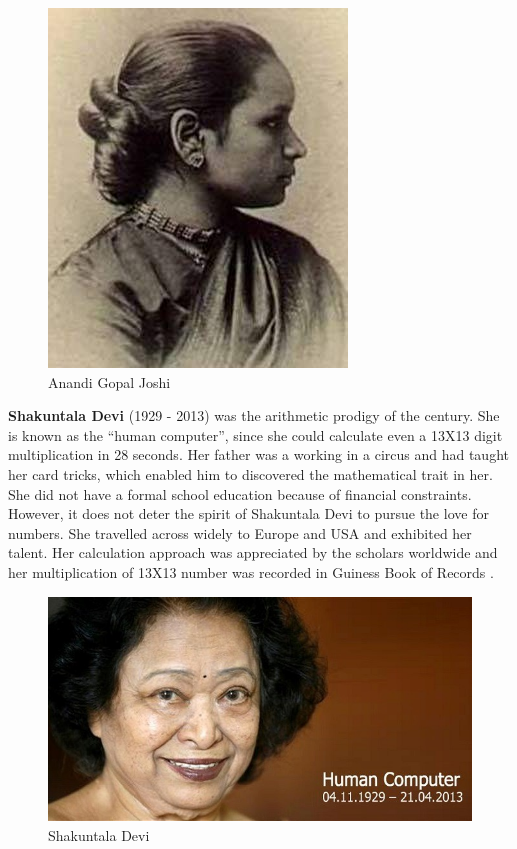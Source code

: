 \documentclass[a4paper,10pt]{article}
\begin{document}
\begin{center}
\begin{figure}[h]
\centering
 \includegraphics[scale=0.4]{anandi.jpg}
 \caption{Anandi Gopal Joshi}
\end{figure}
\end{center}

\newblock
\textbf{Shakuntala Devi} (1929 - 2013) was the arithmetic prodigy of the century. She is known as the ``human computer'', since she could calculate even a 13X13 digit multiplication in 28 seconds. Her father was a working in a circus and had taught her card tricks, which enabled him to discovered the mathematical trait in her. She did not have a formal school education because of financial constraints. However, it does not deter the spirit of Shakuntala Devi to pursue the love for numbers. She travelled across widely to Europe and USA and exhibited her talent. Her calculation approach was appreciated by the scholars worldwide and her multiplication of 13X13 number was recorded in Guiness Book of Records \cite{shakuntala}. 

\begin{center}
\begin{figure}[h]
\centering
 \includegraphics[scale=0.3]{shaku.jpg}
 \caption{Shakuntala Devi}
\end{figure}
\end{center}
\end{document}
